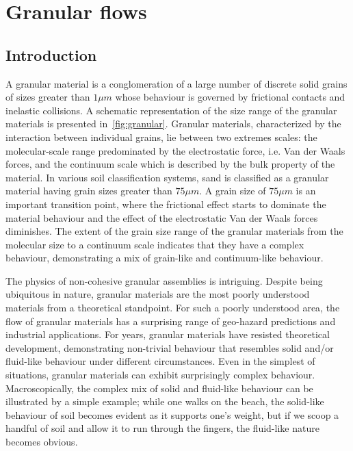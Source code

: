 \chapter{Granular flows}

\ifpdf
    \graphicspath{{Chapter2/figs/raster/}{Chapter2/figs/pdf/}{Chapter2/figs/}}
\else
    \graphicspath{{Chapter2/figs/vector/}{Chapter2/figs/}}
\fi

\section{Introduction}

A granular material is a conglomeration of a large number of discrete solid 
grains of sizes greater than $1\mu m$ whose behaviour is governed by 
frictional contacts and inelastic collisions. A schematic representation of the 
size range of the granular materials is presented in~\cref{fig:granular}. 
Granular materials, characterized by the interaction between individual grains, 
lie between two extremes scales: the molecular-scale range predominated by 
the electrostatic force, i.e. Van der Waals forces, and the continuum scale 
which is described by the bulk property of the material. In various soil 
classification systems, sand is classified as a granular material having grain 
sizes greater than $75\mu m$. A grain size of $75\mu m$ is an important 
transition point, where the frictional effect starts to dominate the material 
behaviour and the effect of the electrostatic Van der Waals forces diminishes. 
The extent of the grain size range of the granular materials from the molecular 
size to a continuum scale indicates that they have a complex behaviour, 
demonstrating a mix of grain-like and continuum-like behaviour.

The physics of non-cohesive granular assemblies is 
intriguing. Despite being ubiquitous in nature, granular materials are the most 
poorly understood materials from a theoretical standpoint. For such a poorly 
understood area, the flow of granular materials has a surprising range of 
geo-hazard predictions and industrial applications. For years, granular 
materials have resisted theoretical development, demonstrating non-trivial 
behaviour that resembles solid and/or fluid-like behaviour under different 
circumstances. Even in the simplest of situations, granular materials can 
exhibit surprisingly complex behaviour. Macroscopically, the complex mix of 
solid and fluid-like behaviour can be illustrated by a simple example; while 
one walks on the beach, the solid-like behaviour of soil becomes evident as it 
supports one's weight, but if we scoop a handful of soil and allow it to run 
through the fingers, the fluid-like nature becomes obvious.

